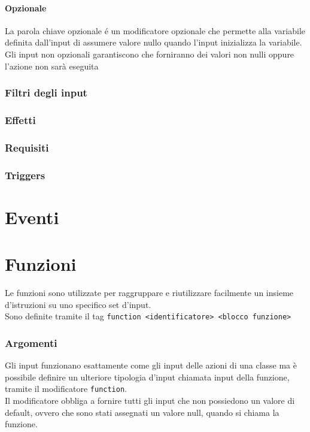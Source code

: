 \paragraph{Opzionale}
La parola chiave opzionale é un modificatore opzionale che permette alla variabile definita dall'input
di assumere valore nullo quando l'input inizializza la variabile. \\ 
Gli input non opzionali garantiscono che forniranno dei valori non nulli oppure l'azione non sarà eseguita

\subsubsection{Filtri degli input}

\subsubsection{Effetti}
\subsubsection{Requisiti}
\subsubsection{Triggers}

\section{Eventi}

\section{Funzioni}
Le funzioni sono utilizzate per raggruppare e riutilizzare facilmente un insieme d'istruzioni 
su uno specifico set d'input. \\ 
Sono definite tramite il tag \verb|function <identificatore> <blocco funzione>|

\subsubsection{Argomenti}
Gli input funzionano esattamente come gli input delle azioni di una classe ma è 
possibile definire un ulteriore tipologia d'input chiamata input della funzione,
tramite il modificatore \verb|function|. \\
Il modificatore obbliga a fornire tutti gli input che non possiedono un valore di default,
ovvero che sono stati assegnati un valore null, quando si chiama la funzione.


